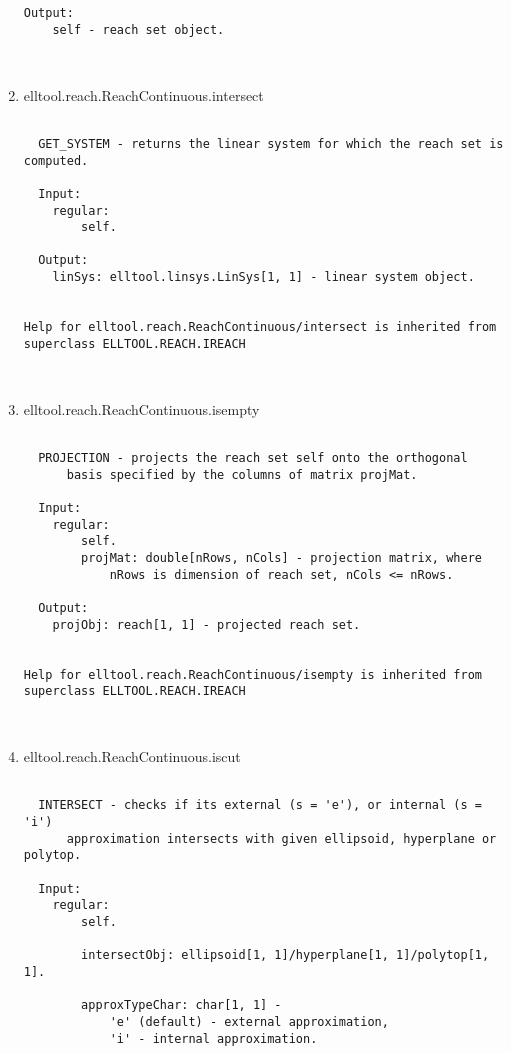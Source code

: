 \begin{enumerate}
\begin{lstlisting}
Output:
    self - reach set object.



\end{lstlisting}
\fontfamily{\familydefault}
\selectfont
\item {elltool.reach.ReachContinuous.intersect}
\selectfont
\begin{lstlisting}

  GET_SYSTEM - returns the linear system for which the reach set is computed.

  Input:
    regular:
        self.

  Output:
    linSys: elltool.linsys.LinSys[1, 1] - linear system object.


Help for elltool.reach.ReachContinuous/intersect is inherited from superclass ELLTOOL.REACH.IREACH



\end{lstlisting}
\fontfamily{\familydefault}
\selectfont
\item {elltool.reach.ReachContinuous.isempty}
\selectfont
\begin{lstlisting}

  PROJECTION - projects the reach set self onto the orthogonal
      basis specified by the columns of matrix projMat.

  Input:
    regular:
        self.
        projMat: double[nRows, nCols] - projection matrix, where
            nRows is dimension of reach set, nCols <= nRows.

  Output:
    projObj: reach[1, 1] - projected reach set.


Help for elltool.reach.ReachContinuous/isempty is inherited from superclass ELLTOOL.REACH.IREACH



\end{lstlisting}
\fontfamily{\familydefault}
\selectfont
\item {elltool.reach.ReachContinuous.iscut}
\selectfont
\begin{lstlisting}

  INTERSECT - checks if its external (s = 'e'), or internal (s = 'i')
      approximation intersects with given ellipsoid, hyperplane or polytop.

  Input:
    regular:
        self.

        intersectObj: ellipsoid[1, 1]/hyperplane[1, 1]/polytop[1, 1].

        approxTypeChar: char[1, 1] -
            'e' (default) - external approximation,
            'i' - internal approximation.


\end{lstlisting}
\end{enumerate}
